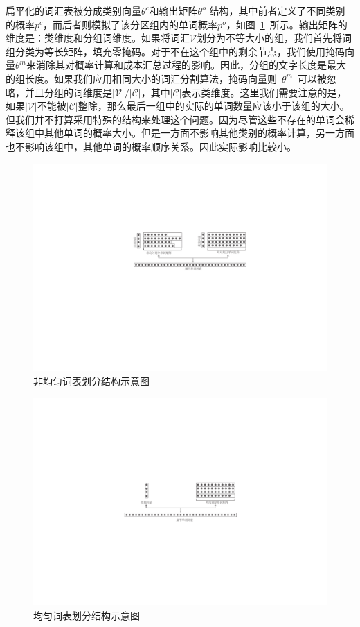 扁平化的词汇表被分成类别向量$ \theta^c $和输出矩阵$ \theta^o $ 结构，其中前者定义了不同类别的概率$ p ^ c $，而后者则模拟了该分区组内的单词概率$ p ^ o $，如图~\ref {fig:chsm}~所示。输出矩阵的维度是：类维度和分组词维度。如果将词汇$ \mathcal {V} $划分为不等大小的组，我们首先将词组分类为等长矩阵，填充零掩码。对于不在这个组中的剩余节点，我们使用掩码向量$ \theta ^ m $来消除其对概率计算和成本汇总过程的影响。因此，分组的文字长度是最大的组长度。如果我们应用相同大小的词汇分割算法，掩码向量则~$\theta^m$~可以被忽略，并且分组的词维度是$ \mathcal {| V | / | C |} $，其中$ \mathcal {| C |} $表示类维度。这里我们需要注意的是，如果$ \mathcal {| V |} $不能被$ \mathcal {| C |} $整除，那么最后一组中的实际的单词数量应该小于该组的大小。但我们并不打算采用特殊的结构来处理这个问题。因为尽管这些不存在的单词会稀释该组中其他单词的概率大小。但是一方面不影响其他类别的概率计算，另一方面也不影响该组中，其他单词的概率顺序关系。因此实际影响比较小。
\begin{figure}[!ht]
  \centering
\includegraphics[width=.9\linewidth]{./figures/chsm-simple.pdf}
\caption{非均匀词表划分结构示意图}\label{fig:chsm}
\end{figure}

\begin{figure}[!ht]
  \centering
\includegraphics[width=.9\linewidth]{./figures/chsm-simple2.pdf}
\caption{均匀词表划分结构示意图}\label{fig:chsm2}
\end{figure}

